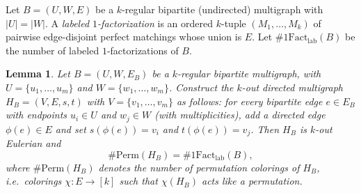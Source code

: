 \documentclass[a4paper,10pt]{amsart}
\theoremstyle{plain}
\newtheorem{lemma}[theorem]{Lemma}
\theoremstyle{definition}
\begin{document}
\medskip
Let $B=(U,W,E)$ be a $k$-regular bipartite (undirected) multigraph with $|U|=|W|$. A \emph{labeled $1$-factorization}
is an ordered $k$-tuple $(M_1,\dots,M_k)$ of pairwise edge-disjoint perfect matchings whose union is $E$.
Let $\#1\mathrm{Fact}_{\mathrm{lab}}(B)$ be the number of labeled $1$-factorizations of $B$.
\begin{lemma}\label{lem:bip-eul-correspondence}
Let $B=(U,W,E_B)$ be a $k$-regular bipartite multigraph, with $U=\{u_1,\dots,u_m\}$ and $W=\{w_1,\dots,w_m\}$. Construct the $k$-out directed multigraph $H_B=(V,E,s,t)$ with $V=\{v_1,\dots,v_m\}$ as follows: for every bipartite edge $e\in E_B$ with endpoints $u_i\in U$ and $w_j\in W$ (with multiplicities), add a directed edge $\phi(e)\in E$ and set $s(\phi(e))=v_i$ and $t(\phi(e))=v_j$. Then $H_B$ is $k$-out Eulerian and
\[
\#\mathrm{Perm}(H_B)=\#1\mathrm{Fact}_{\mathrm{lab}}(B),
\]
where $\#\mathrm{Perm}(H_B)$ denotes the number of permutation colorings of $H_B$, i.e.\ colorings $\chi:E\to[k]$ such that $\chi(H_B)$ acts like a permutation.
\end{lemma}
\end{document}
